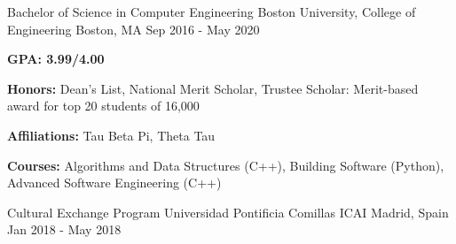 



\begin{cventries}


\cventry
{Bachelor of Science in Computer Engineering} %
{Boston University, College of Engineering} %
{Boston, MA} %
{Sep 2016 - May 2020} %
{ %
\begin{cvitems}
\item {\textcolor{dark-grey}{\textbf{GPA: 3.99/4.00}}}
\item {\textcolor{dark-grey}{\textbf{Honors:}} Dean’s List, National Merit Scholar, Trustee Scholar: Merit-based award for top 20 students of 16,000}
\item {\textcolor{dark-grey}{\textbf{Affiliations:}} Tau Beta Pi, Theta Tau}
\item {\textcolor{dark-grey}{\textbf{Courses:}} Algorithms and Data Structures (C++), Building Software (Python), Advanced Software Engineering (C++)}
\end{cvitems}
}

\cventry
{Cultural Exchange Program} %
{Universidad Pontificia Comillas ICAI} %
{Madrid, Spain} %
{Jan 2018 - May 2018} %
{ %
}


\end{cventries}
